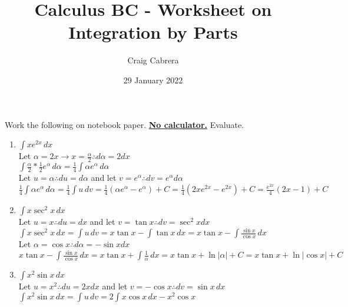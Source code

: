 \documentclass[10pt, letterpaper]{report}
\title{Calculus BC - Worksheet on Integration by Parts}
\author{Craig Cabrera}
\date{29 January 2022}
\begin{document}
\maketitle
\noindent Work the following on notebook paper. \textbf{\underline{No calculator.}}
\noindent Evaluate.
\begin{enumerate}
  \item{$\int{xe^{2x}}\,dx$} \\

    Let $\alpha=2x\rightarrow x=\frac{\alpha}{2}\therefore d\alpha=2dx$ \\

    $\int{\frac{\alpha}{2}*\frac{1}{2}e^{\alpha}}\,d\alpha=\frac{1}{4}\int{\alpha e^{\alpha}}\,d\alpha$ \\

    Let $u=\alpha\therefore du=d\alpha$ and let $v=e^{\alpha}\therefore dv=e^{\alpha}d\alpha$ \\

    $\frac{1}{4}\int{\alpha e^{\alpha}}\,d\alpha=\frac{1}{4}\int{u}\,dv=
    \frac{1}{4}\left(\alpha e^{\alpha}-e^{\alpha}\right)+C=
    \frac{1}{4}(2xe^{2x}-e^{2x})+C=\frac{e^{2x}}{4}(2x-1)+C$ \\

  \item{$\int{x\sec^{2}{x}}\,dx$} \\

    Let $u=x\therefore du=dx$ and let $v=\tan{x}\therefore dv=\sec^{2}{x}dx$ \\

    $\int{x\sec^{2}{x}}\,dx=\int{u}\,dv=x\tan{x}-\int{\tan{x}}\,dx=
    x\tan{x}-\int{\frac{\sin{x}}{\cos{x}}}\,dx$ \\

    Let $\alpha=\cos{x}\therefore d\alpha=-\sin{x}dx$ \\

    $x\tan{x}-\int{\frac{\sin{x}}{\cos{x}}}\,dx=
    x\tan{x}+\int{\frac{1}{\alpha}}\,dx=
    x\tan{x}+\ln{|\alpha|}+C=x\tan{x}+\ln{|\cos{x}|}+C$ \\

  \item{$\int{x^{2}\sin{x}}\,dx$ \\

    Let $u=x^{2}\therefore du=2xdx$ and let $v=-\cos{x}\therefore dv=\sin{x}\,dx$ \\

    $\int{x^{2}\sin{x}}\,dx=\int{u}\,dv=2\int{x\cos{x}}\,dx-x^{2}\cos{x}
    $ \\

}
\end{enumerate}
\end{document}
